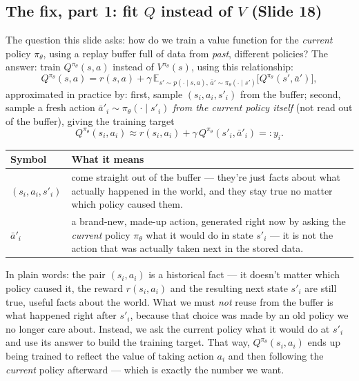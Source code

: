 \documentclass[11pt]{article}
\begin{document}
\subsection{The fix, part 1: fit $Q$ instead of $V$ (Slide 18)}
The question this slide asks: how do we train a value function for the \emph{current} policy $\pi_\theta$, using a replay buffer full of data from \emph{past}, different policies? The answer: train $Q^{\pi_\theta}(s,a)$ instead of $V^{\pi_\theta}(s)$, using this relationship:
$$Q^{\pi_\theta}(s,a) = r(s,a) + \gamma\,\mathbb{E}_{s'\sim p(\cdot\mid s,a),\,\bar a'\sim \pi_\theta(\cdot\mid s')}\big[Q^{\pi_\theta}(s',\bar a')\big],$$
approximated in practice by: first, sample $(s_i,a_i,s'_i)$ from the buffer; second, sample a fresh action $\bar a'_i \sim \pi_\theta(\cdot\mid s'_i)$ \emph{from the current policy itself} (not read out of the buffer), giving the training target
$$Q^{\pi_\theta}(s_i,a_i) \approx r(s_i,a_i) + \gamma\, Q^{\pi_\theta}(s'_i,\bar a'_i) =: y_i.$$
\begin{center}
\begin{tabular}{@{} >{\raggedright\arraybackslash}p{} >{\raggedright\arraybackslash}p{} @{}}
\toprule
\textbf{Symbol} & \textbf{What it means} \\
\midrule
$(s_i,a_i,s'_i)$ & come straight out of the buffer --- they're just facts about what actually happened in the world, and they stay true no matter which policy caused them. \\
$\bar a'_i$ & a brand-new, made-up action, generated right now by asking the \emph{current} policy $\pi_\theta$ what it would do in state $s'_i$ --- it is not the action that was actually taken next in the stored data. \\
\bottomrule
\end{tabular}
\end{center}

In plain words: the pair $(s_i,a_i)$ is a historical fact --- it doesn't matter which policy caused it, the reward $r(s_i,a_i)$ and the resulting next state $s'_i$ are still true, useful facts about the world. What we must \emph{not} reuse from the buffer is what happened right after $s'_i$, because that choice was made by an old policy we no longer care about. Instead, we ask the current policy what it would do at $s'_i$ and use its answer to build the training target. That way, $Q^{\pi_\theta}(s_i,a_i)$ ends up being trained to reflect the value of taking action $a_i$ and then following the \emph{current} policy afterward --- which is exactly the number we want.
\end{document}
